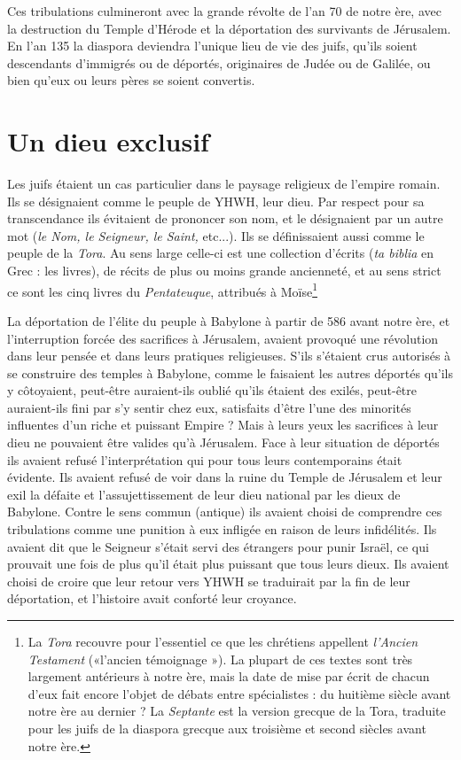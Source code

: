  Ces tribulations culmineront avec la grande révolte de l'an 70 de notre ère, avec la destruction du Temple d'Hérode et la déportation des survivants de Jérusalem. En l'an 135 la diaspora deviendra l'unique lieu de vie des juifs, qu'ils soient descendants d'immigrés ou de déportés, originaires de Judée ou de Galilée, ou bien qu'eux ou leurs pères se soient convertis. 


\section{Un dieu exclusif}

 Les juifs étaient un cas particulier dans le paysage religieux de l'empire romain. Ils se désignaient comme le peuple de YHWH, leur dieu. Par respect pour sa transcendance ils évitaient de prononcer son nom, et le désignaient par un autre mot (\emph{le Nom, le Seigneur, le Saint,} etc...). Ils se définissaient aussi comme le peuple de la \emph{Tora}. Au sens large celle-ci est une collection d'écrits (\emph{ta biblia} en Grec : les livres), de récits de plus ou moins grande ancienneté, et au sens strict ce sont les cinq livres du \emph{Pentateuque}, attribués à Moïse\footnote{La \emph{Tora} recouvre pour l'essentiel ce que les chrétiens appellent \emph{l'Ancien Testament} («l'ancien témoignage »). La plupart de ces textes sont très largement antérieurs à notre ère, mais la date de mise par écrit de chacun d'eux fait encore l'objet de débats entre spécialistes : du huitième siècle avant notre ère au dernier ? La \emph{Septante} est la version grecque de la Tora, traduite pour les juifs de la diaspora grecque aux troisième et second siècles avant notre ère.}%
 
 
 
 La déportation de l'élite du peuple à Babylone à partir de 586 avant notre ère, et l'interruption forcée des sacrifices à Jérusalem, avaient provoqué une révolution dans leur pensée et dans leurs pratiques religieuses. S'ils s'étaient crus autorisés à se construire des temples à Babylone, comme le faisaient les autres déportés qu'ils y côtoyaient, peut-être auraient-ils oublié qu'ils étaient des exilés, peut-être auraient-ils fini par s'y sentir chez eux, satisfaits d'être l'une des minorités influentes d'un riche et puissant Empire ? Mais à leurs yeux les sacrifices à leur dieu ne pouvaient être valides qu'à Jérusalem. Face à leur situation de déportés ils avaient refusé l'interprétation qui pour tous leurs contemporains était évidente. Ils avaient refusé de voir dans la ruine du Temple de Jérusalem et leur exil la défaite et l'assujettissement de leur dieu national par les dieux de Babylone. Contre le sens commun (antique) ils avaient choisi de comprendre ces tribulations comme une punition à eux infligée en raison de leurs infidélités. Ils avaient dit que le Seigneur s'était servi des étrangers pour punir Israël, ce qui prouvait une fois de plus qu'il était plus puissant que tous leurs dieux. Ils avaient choisi de croire que leur retour vers YHWH se traduirait par la fin de leur déportation, et l'histoire avait conforté leur croyance. 
 
